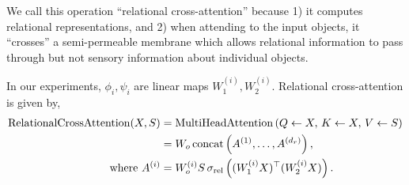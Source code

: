 \begin{remark}
    We call this operation ``relational cross-attention'' because 1) it computes relational representations, and 2) when attending to the input objects, it ``crosses'' a semi-permeable membrane which allows relational information to pass through but not sensory information about individual objects.
\end{remark}

In our experiments, $\phi_i, \psi_i$ are linear maps $W_1^{(i)}, W_2^{(i)}$. Relational cross-attention is given by,
\begin{equation}
    \begin{split}
        \mathrm{RelationalCrossAttention}(X, S) &= \mathrm{MultiHeadAttention}\left(Q \gets X,\, K \gets X,\, V \gets S\right) \\
        &= W_o \, \mathrm{concat}\left(A^{(1)}, \ldots, A^{(d_r)}\right), \\
        \text{where } A^{(i)} &= W_o^{(i)} S \, \sigma_{\mathrm{rel}}\left((W_1^{(i)} X)^\top (W_2^{(i)} X)\right).
    \end{split}
\end{equation}

